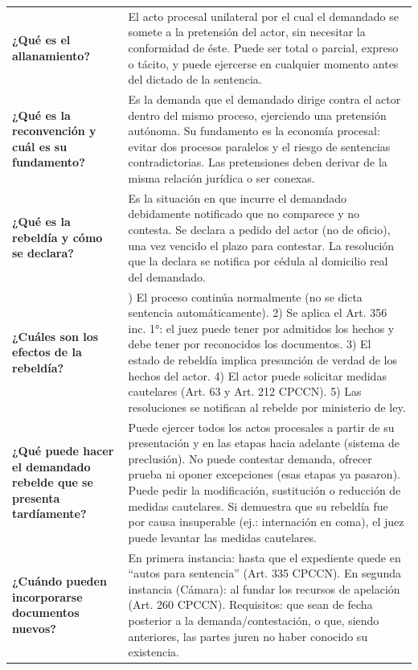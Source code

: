 \documentclass[12pt,oneside]{book}
\begin{document}
\begin{longtable}{
    >{\raggedright\arraybackslash}p{}
    >{\raggedright\arraybackslash}p{}
}
\textbf{¿Qué es el allanamiento?} &
El acto procesal unilateral por el cual el demandado se somete a la pretensión del actor, sin necesitar la conformidad de éste. Puede ser total o parcial, expreso o tácito, y puede ejercerse en cualquier momento antes del dictado de la sentencia. \\

\textbf{¿Qué es la reconvención y cuál es su fundamento?} &
Es la demanda que el demandado dirige contra el actor dentro del mismo proceso, ejerciendo una pretensión autónoma. Su fundamento es la economía procesal: evitar dos procesos paralelos y el riesgo de sentencias contradictorias. Las pretensiones deben derivar de la misma relación jurídica o ser conexas. \\

\textbf{¿Qué es la rebeldía y cómo se declara?} &
Es la situación en que incurre el demandado debidamente notificado que no comparece y no contesta. Se declara a pedido del actor (no de oficio), una vez vencido el plazo para contestar. La resolución que la declara se notifica por cédula al domicilio real del demandado. \\

\textbf{¿Cuáles son los efectos de la rebeldía?} &
1) El proceso continúa normalmente (no se dicta sentencia automáticamente). 2) Se aplica el Art. 356 inc. 1°: el juez puede tener por admitidos los hechos y debe tener por reconocidos los documentos. 3) El estado de rebeldía implica presunción de verdad de los hechos del actor. 4) El actor puede solicitar medidas cautelares (Art. 63 y Art. 212 CPCCN). 5) Las resoluciones se notifican al rebelde por ministerio de ley. \\

\textbf{¿Qué puede hacer el demandado rebelde que se presenta tardíamente?} &
Puede ejercer todos los actos procesales a partir de su presentación y en las etapas hacia adelante (sistema de preclusión). No puede contestar demanda, ofrecer prueba ni oponer excepciones (esas etapas ya pasaron). Puede pedir la modificación, sustitución o reducción de medidas cautelares. Si demuestra que su rebeldía fue por causa insuperable (ej.: internación en coma), el juez puede levantar las medidas cautelares. \\

\textbf{¿Cuándo pueden incorporarse documentos nuevos?} &
En primera instancia: hasta que el expediente quede en ``autos para sentencia'' (Art. 335 CPCCN). En segunda instancia (Cámara): al fundar los recursos de apelación (Art. 260 CPCCN). Requisitos: que sean de fecha posterior a la demanda/contestación, o que, siendo anteriores, las partes juren no haber conocido su existencia. \\


\end{longtable}
\end{document}
